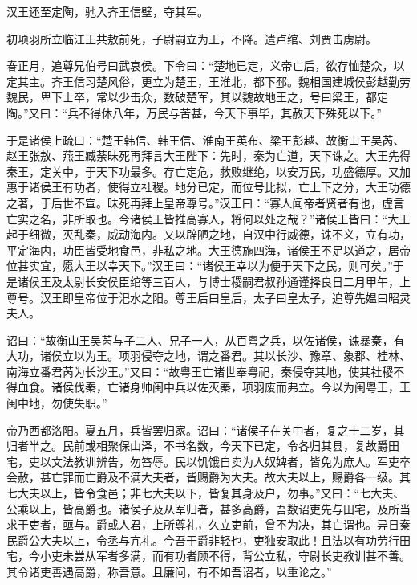 \documentclass[12pt,UTF8]{ctexbook}
\begin{document}
汉王还至定陶，驰入齐王信壁，夺其军。



初项羽所立临江王共敖前死，子尉嗣立为王，不降。遣卢绾、刘贾击虏尉。



春正月，追尊兄伯号曰武哀侯。下令曰：“楚地已定，义帝亡后，欲存恤楚众，以定其主。齐王信习楚风俗，更立为楚王，王淮北，都下邳。魏相国建城侯彭越勤劳魏民，卑下士卒，常以少击众，数破楚军，其以魏故地王之，号曰梁王，都定陶。”又曰：“兵不得休八年，万民与苦甚，今天下事毕，其赦天下殊死以下。”



于是诸侯上疏曰：“楚王韩信、韩王信、淮南王英布、梁王彭越、故衡山王吴芮、赵王张敖、燕王臧荼昧死再拜言大王陛下：先时，秦为亡道，天下诛之。大王先得秦王，定关中，于天下功最多。存亡定危，救败继绝，以安万民，功盛德厚。又加惠于诸侯王有功者，使得立社稷。地分已定，而位号比拟，亡上下之分，大王功德之著，于后世不宣。昧死再拜上皇帝尊号。”汉王曰：“寡人闻帝者贤者有也，虚言亡实之名，非所取也。今诸侯王皆推高寡人，将何以处之哉？”诸侯王皆曰：“大王起于细微，灭乱秦，威动海内。又以辟陋之地，自汉中行威德，诛不义，立有功，平定海内，功臣皆受地食邑，非私之地。大王德施四海，诸侯王不足以道之，居帝位甚实宜，愿大王以幸天下。”汉王曰：“诸侯王幸以为便于天下之民，则可矣。”于是诸侯王及太尉长安侯臣绾等三百人，与博士稷嗣君叔孙通谨择良日二月甲午，上尊号。汉王即皇帝位于汜水之阳。尊王后曰皇后，太子曰皇太子，追尊先媪曰昭灵夫人。



诏曰：“故衡山王吴芮与子二人、兄子一人，从百粤之兵，以佐诸侯，诛暴秦，有大功，诸侯立以为王。项羽侵夺之地，谓之番君。其以长沙、豫章、象郡、桂林、南海立番君芮为长沙王。”又曰：“故粤王亡诸世奉粤祀，秦侵夺其地，使其社稷不得血食。诸侯伐秦，亡诸身帅闽中兵以佐灭秦，项羽废而弗立。今以为闽粤王，王闽中地，勿使失职。”



帝乃西都洛阳。夏五月，兵皆罢归家。诏曰：“诸侯子在关中者，复之十二岁，其归者半之。民前或相聚保山泽，不书名数，今天下已定，令各归其县，复故爵田宅，吏以文法教训辨告，勿笞辱。民以饥饿自卖为人奴婢者，皆免为庶人。军吏卒会赦，甚亡罪而亡爵及不满大夫者，皆赐爵为大夫。故大夫以上，赐爵各一级。其七大夫以上，皆令食邑；非七大夫以下，皆复其身及户，勿事。”又曰：“七大夫、公乘以上，皆高爵也。诸侯子及从军归者，甚多高爵，吾数诏吏先与田宅，及所当求于吏者，亟与。爵或人君，上所尊礼，久立吏前，曾不为决，其亡谓也。异日秦民爵公大夫以上，令丞与亢礼。今吾于爵非轻也，吏独安取此！且法以有功劳行田宅，今小吏未尝从军者多满，而有功者顾不得，背公立私，守尉长吏教训甚不善。其令诸吏善遇高爵，称吾意。且廉问，有不如吾诏者，以重论之。”
\end{document}
